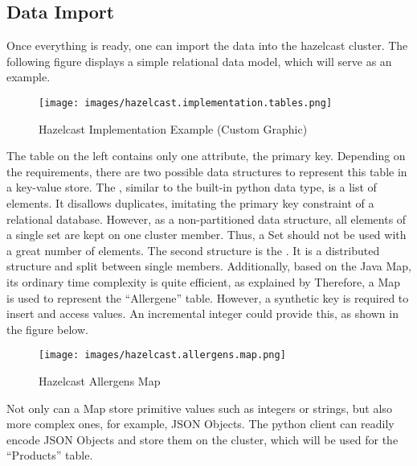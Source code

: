 \subsection{Data Import} \label{subsec:dataImportHazelcast}

Once everything is ready, one can import the data into the hazelcast cluster. The following figure displays
a simple relational data model, which will serve as an example.

\begin{figure}[H]
    \centering
    \caption[Hazelcast Implementation Example]{Hazelcast Implementation Example (Custom Graphic)} \label{fig:hazelcast.implementation.tables}
    \texttt{[image: images/hazelcast.implementation.tables.png]}
\end{figure}

The table on the left contains only one attribute, the primary key. Depending on the requirements,
there are two possible data structures to represent this table in a key-value store.
The \textcite{Hazelcast.DataStructure.Set}, similar to
the built-in python data type, is a list of elements. It disallows duplicates, imitating the primary
key constraint of a relational database.
However, as a non-partitioned data structure,
all elements of a single set are kept on one cluster member. Thus, a Set should not be used with a great number of elements.
The second structure is the \textcite{Hazelcast.DataStructure.Map}. It is a distributed structure and split between single members.
Additionally, based on the Java Map, its ordinary time
complexity is quite efficient, as explained by \textcite{Hazelcast.Java.Map}
Therefore, a Map is used to represent the \enquote{Allergene} table.
However, a synthetic key is required to insert and access values.
An incremental integer could provide this, as shown in the figure below.


\begin{figure}[H]
    \centering
    \caption{Hazelcast Allergens Map} \label{fig:hazelcast.allergens.map}
    \texttt{[image: images/hazelcast.allergens.map.png]}
\end{figure}

Not only can a Map store primitive values such as integers or strings, but also more complex ones, for
example, JSON Objects. The python client can readily encode JSON Objects and store them on the cluster,
which will be used for the \enquote{Products} table.
\parencite{Hazelcast.PythonClient.HazelcastJsonValue}

